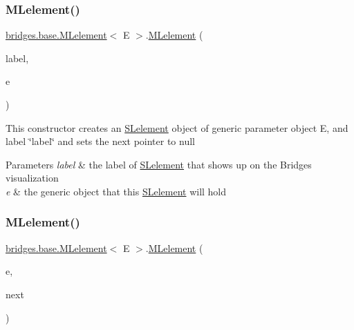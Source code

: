 \subsubsection{\texorpdfstring{M\+Lelement()}{MLelement()}\hspace{0.1cm}{\footnotesize\ttfamily [2/4]}}
{\footnotesize\ttfamily \mbox{\hyperlink{classbridges_1_1base_1_1_m_lelement}{bridges.\+base.\+M\+Lelement}}$<$ E $>$.\mbox{\hyperlink{classbridges_1_1base_1_1_m_lelement}{M\+Lelement}} (\begin{DoxyParamCaption}\item[{String}]{label,  }\item[{E}]{e }\end{DoxyParamCaption})}

This constructor creates an \mbox{\hyperlink{classbridges_1_1base_1_1_s_lelement}{S\+Lelement}} object of generic parameter object E, and label \char`\"{}label\char`\"{} and sets the next pointer to null


\begin{DoxyParams}{Parameters}
{\em label} & the label of \mbox{\hyperlink{classbridges_1_1base_1_1_s_lelement}{S\+Lelement}} that shows up on the Bridges visualization \\
\hline
{\em e} & the generic object that this \mbox{\hyperlink{classbridges_1_1base_1_1_s_lelement}{S\+Lelement}} will hold \\
\hline
\end{DoxyParams}
\mbox{\label{classbridges_1_1base_1_1_m_lelement_ad3d5fe59028cd6854eb2abceefad7f7d}} 
\subsubsection{\texorpdfstring{M\+Lelement()}{MLelement()}\hspace{0.1cm}{\footnotesize\ttfamily [3/4]}}
{\footnotesize\ttfamily \mbox{\hyperlink{classbridges_1_1base_1_1_m_lelement}{bridges.\+base.\+M\+Lelement}}$<$ E $>$.\mbox{\hyperlink{classbridges_1_1base_1_1_m_lelement}{M\+Lelement}} (\begin{DoxyParamCaption}\item[{E}]{e,  }\item[{\mbox{\hyperlink{classbridges_1_1base_1_1_m_lelement}{M\+Lelement}}$<$ E $>$}]{next }\end{DoxyParamCaption})}

